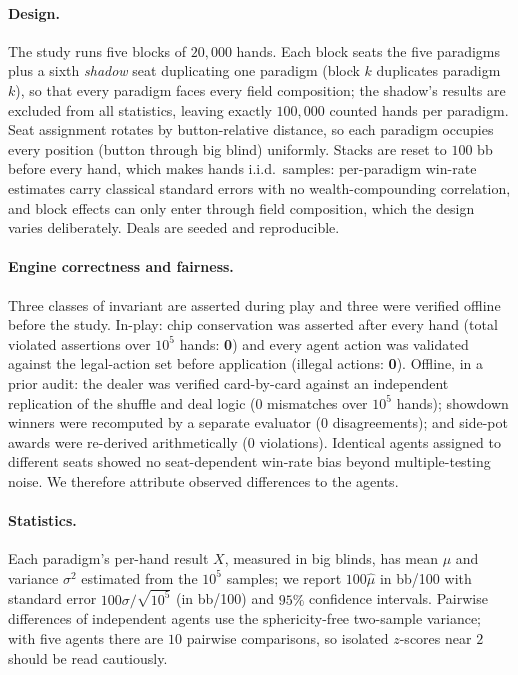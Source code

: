 \paragraph{Design.} The study runs five blocks of $20{,}000$ hands. Each block seats the five paradigms plus a sixth \emph{shadow} seat duplicating one paradigm (block $k$ duplicates paradigm $k$), so that every paradigm faces every field composition; the shadow's results are excluded from all statistics, leaving exactly $100{,}000$ counted hands per paradigm. Seat assignment rotates by button-relative distance, so each paradigm occupies every position (button through big blind) uniformly. Stacks are reset to $100$ bb before every hand, which makes hands i.i.d.\ samples: per-paradigm win-rate estimates carry classical standard errors with no wealth-compounding correlation, and block effects can only enter through field composition, which the design varies deliberately. Deals are seeded and reproducible.

\paragraph{Engine correctness and fairness.} Three classes of invariant are asserted during play and three were verified offline before the study. In-play: chip conservation was asserted after every hand (total violated assertions over $10^{5}$ hands: \textbf{0}) and every agent action was validated against the legal-action set before application (illegal actions: \textbf{0}). Offline, in a prior audit: the dealer was verified card-by-card against an independent replication of the shuffle and deal logic ($0$ mismatches over $10^{5}$ hands); showdown winners were recomputed by a separate evaluator ($0$ disagreements); and side-pot awards were re-derived arithmetically ($0$ violations). Identical agents assigned to different seats showed no seat-dependent win-rate bias beyond multiple-testing noise. We therefore attribute observed differences to the agents.

\paragraph{Statistics.} Each paradigm's per-hand result $X$, measured in big blinds, has mean $\mu$ and variance $\sigma^{2}$ estimated from the $10^{5}$ samples; we report $100\hat\mu$ in bb/100 with standard error $100\sigma/\sqrt{10^{5}}$ (in bb/100) and $95\%$ confidence intervals. Pairwise differences of independent agents use the sphericity-free two-sample variance; with five agents there are $10$ pairwise comparisons, so isolated $z$-scores near $2$ should be read cautiously.

